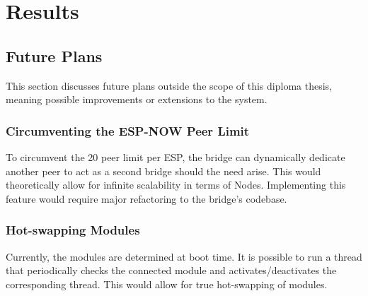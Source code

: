 \renewcommand*\chapterpagestyle{scrheadings}
\chapter{Results} 

\section{Future Plans}
This section discusses future plans outside the scope of this diploma thesis,
meaning possible improvements or extensions to the system.

    \subsection{Circumventing the ESP-NOW Peer Limit}
    To circumvent the 20 peer limit per ESP, the bridge can dynamically
    dedicate another peer to act as a second bridge should the
    need arise. This would theoretically allow for infinite scalability in terms
    of Nodes. Implementing this feature would require major refactoring to the
    bridge's codebase.

    \subsection{Hot-swapping Modules}
    Currently, the modules are determined at boot time. It is possible to run
    a thread that periodically checks the connected module and activates/deactivates 
    the corresponding thread. This would allow for true hot-swapping of modules.
